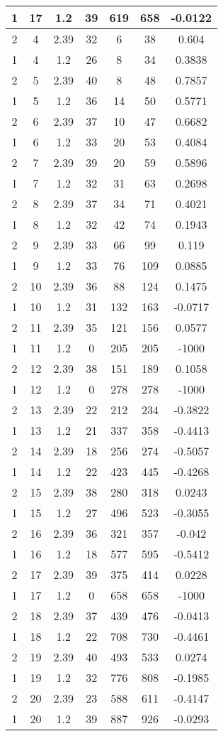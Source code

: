 \documentclass[letterpaper, 12pt]{article}
\begin{document}
\begin{longtable}{|c|c|c|c|c|c|c|}
\hline
1 & 17 & 1.2 & 39 & 619 & 658 & -0.0122 \\
\hline
2 & 4 & 2.39 & 32 & 6 & 38 & 0.604 \\
\hline
1 & 4 & 1.2 & 26 & 8 & 34 & 0.3838 \\
\hline
2 & 5 & 2.39 & 40 & 8 & 48 & 0.7857 \\
\hline
1 & 5 & 1.2 & 36 & 14 & 50 & 0.5771 \\
\hline
2 & 6 & 2.39 & 37 & 10 & 47 & 0.6682 \\
\hline
1 & 6 & 1.2 & 33 & 20 & 53 & 0.4084 \\
\hline
2 & 7 & 2.39 & 39 & 20 & 59 & 0.5896 \\
\hline
1 & 7 & 1.2 & 32 & 31 & 63 & 0.2698 \\
\hline
2 & 8 & 2.39 & 37 & 34 & 71 & 0.4021 \\
\hline
1 & 8 & 1.2 & 32 & 42 & 74 & 0.1943 \\
\hline
2 & 9 & 2.39 & 33 & 66 & 99 & 0.119 \\
\hline
1 & 9 & 1.2 & 33 & 76 & 109 & 0.0885 \\
\hline
2 & 10 & 2.39 & 36 & 88 & 124 & 0.1475 \\
\hline
1 & 10 & 1.2 & 31 & 132 & 163 & -0.0717 \\
\hline
2 & 11 & 2.39 & 35 & 121 & 156 & 0.0577 \\
\hline
1 & 11 & 1.2 & 0 & 205 & 205 & -1000 \\
\hline
2 & 12 & 2.39 & 38 & 151 & 189 & 0.1058 \\
\hline
1 & 12 & 1.2 & 0 & 278 & 278 & -1000 \\
\hline
2 & 13 & 2.39 & 22 & 212 & 234 & -0.3822 \\
\hline
1 & 13 & 1.2 & 21 & 337 & 358 & -0.4413 \\
\hline
2 & 14 & 2.39 & 18 & 256 & 274 & -0.5057 \\
\hline
1 & 14 & 1.2 & 22 & 423 & 445 & -0.4268 \\
\hline
2 & 15 & 2.39 & 38 & 280 & 318 & 0.0243 \\
\hline
1 & 15 & 1.2 & 27 & 496 & 523 & -0.3055 \\
\hline
2 & 16 & 2.39 & 36 & 321 & 357 & -0.042 \\
\hline
1 & 16 & 1.2 & 18 & 577 & 595 & -0.5412 \\
\hline
2 & 17 & 2.39 & 39 & 375 & 414 & 0.0228 \\
\hline
1 & 17 & 1.2 & 0 & 658 & 658 & -1000 \\
\hline
2 & 18 & 2.39 & 37 & 439 & 476 & -0.0413 \\
\hline
1 & 18 & 1.2 & 22 & 708 & 730 & -0.4461 \\
\hline
2 & 19 & 2.39 & 40 & 493 & 533 & 0.0274 \\
\hline
1 & 19 & 1.2 & 32 & 776 & 808 & -0.1985 \\
\hline
2 & 20 & 2.39 & 23 & 588 & 611 & -0.4147 \\
\hline
1 & 20 & 1.2 & 39 & 887 & 926 & -0.0293 \\
\hline
\end{longtable}
\end{document}
